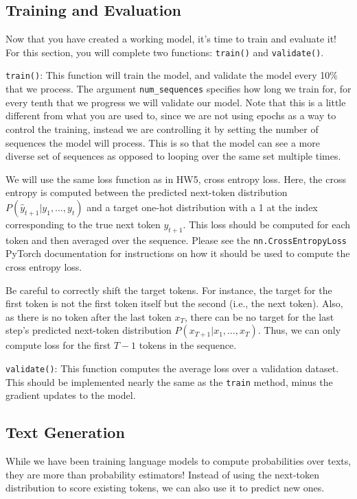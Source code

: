 \documentclass[11pt,addpoints,answers]{exam}
\begin{document}
\subsection{Training and Evaluation}\label{train_and_eval}

Now that you have created a working model, it's time to train and evaluate it! For this section, you will complete two functions: \texttt{train()} and \texttt{validate()}.

\texttt{train()}: This function will train the model, and validate the model every 10\% that we process. The argument \texttt{num\_sequences} specifies how long we train for, for every tenth that we progress we will validate our model. Note that this is a little different from what you are used to, since we are not using epochs as a way to control the training, instead we are controlling it by setting the number of sequences the model will process. This is so that the model can see a more diverse set of sequences as opposed to looping over the same set multiple times.

We will use the same loss function as in HW5, cross entropy loss. Here, the cross entropy is computed between the predicted next-token distribution $P(\hat{y}_{t+1}|y_1, \ldots, y_t)$ and a target one-hot distribution with a 1 at the index corresponding to the true next token $y_{t+1}$. This loss should be computed for each token and then averaged over the sequence. Please see the \texttt{nn.CrossEntropyLoss} PyTorch documentation for instructions on how it should be used to compute the cross entropy loss.

Be careful to correctly shift the target tokens. For instance, the target for the first token is not the first token itself but the second (i.e., the next token). Also, as there is no token after the last token $x_T$, there can be no target for the last step's predicted next-token distribution $P(x_{T+1} | x_1, \ldots, x_T)$. Thus, we can only compute loss for the first $T-1$ tokens in the sequence.

\texttt{validate()}: This function computes the average loss over a validation dataset. This should be implemented nearly the same as the \texttt{train} method, minus the gradient updates to the model.

\subsection{Text Generation}
While we have been training language models to compute probabilities over texts, they are more than probability estimators! Instead of using the next-token distribution to score existing tokens, we can also use it to predict new ones.
\end{document}
